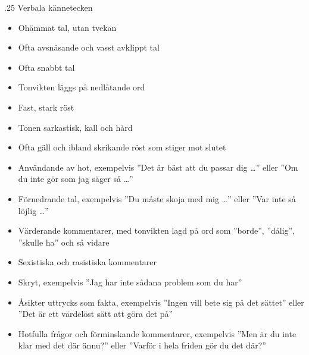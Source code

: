 \documentclass[swedish,a4paper]{book}
\makeatletter
\renewcommand\subsection{\@startsection{subsection}{1}{\z@}%
                                   {\baselineskip}%
                                   {.25\baselineskip}%
                                   {\fontsize{1\baselineskip}{1.25\baselineskip}\selectfont\sffamily\bfseries}} %
\makeatother
\begin{document}
\subsection{Verbala kännetecken}

\begin{itemize}


\item Ohämmat tal, utan tvekan

\item Ofta avsnäsande och vasst avklippt tal

\item Ofta snabbt tal

\item Tonvikten läggs på nedlåtande ord

\item Fast, stark röst

\item Tonen sarkastisk, kall och hård

\item Ofta gäll och ibland skrikande röst som stiger mot slutet

\item Användande av hot, exempelvis ''Det är bäst att du passar dig \ldots{}'' eller ''Om du inte gör som jag säger så \ldots{}''

\item Förnedrande tal, exempelvis ''Du måste skoja med mig \ldots{}'' eller ''Var inte så löjlig \ldots{}''

\item Värderande kommentarer, med tonvikten lagd på ord som ''borde'', ''dålig'', ''skulle ha'' och så vidare

\item Sexistiska och rasistiska kommentarer

\item Skryt, exempelvis ''Jag har inte sådana problem som du har''

\item Åsikter uttrycks som fakta, exempelvis ''Ingen vill bete sig på det sättet'' eller ''Det är ett värdelöst sätt att göra det på''

\item Hotfulla frågor och förminskande kommentarer, exempelvis ''Men är du inte klar med det där ännu?'' eller ''Varför i hela friden gör du det där?''

\end{itemize}
\end{document}
